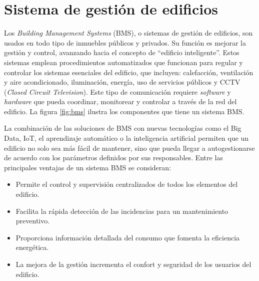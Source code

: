 





\section{Sistema de gestión de edificios}
Los \emph{Building Management Systems} (BMS), o sistemas de gestión de edificios, son usados en todo tipo de inmuebles públicos y privados. Su función es mejorar la gestión y control, avanzando hacia el concepto de ``edificio inteligente''. Estos sistemas emplean procedimientos automatizados que funcionan para regular y controlar los sistemas esenciales del edificio, que incluyen: calefacción, ventilación y aire acondicionado, iluminación, energía, uso de servicios públicos y CCTV (\emph{Closed Circuit Television}). Este tipo de comunicación requiere \emph{software} y \emph{hardware} que pueda coordinar, monitorear y controlar a través de la red del edificio. La figura \ref{fig:bms}  ilustra los componentes que tiene un sistema BMS.

La combinación de las soluciones de BMS con nuevas tecnologías como el Big Data, IoT, el aprendizaje automático o la inteligencia artificial permiten que un edificio no solo sea más fácil de mantener, sino que pueda llegar a autogestionarse de acuerdo con los parámetros definidos por sus responsables. Entre las principales ventajas de un sistema BMS se consideran:

\vspace{0.25cm}
\begin{itemize}
\item Permite el control y supervisión centralizados de todos los elementos del edificio.
\item Facilita la rápida detección de las incidencias para un mantenimiento preventivo.
\item Proporciona información detallada del consumo que fomenta la eficiencia energética.
\item La mejora de la gestión incrementa el confort y seguridad de los usuarios del edificio.
\end{itemize} 


